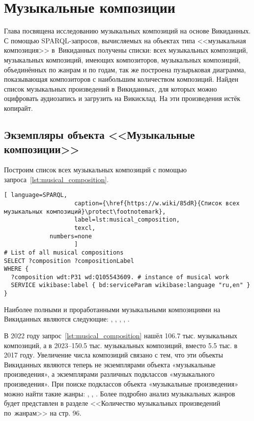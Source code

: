 \chapter{Музыкальные композиции}
\label{ch:musical-composition}
Глава посвящена исследованию музыкальных композиций на основе Викиданных. С помощью SPARQL-запросов, вычисляемых на объектах типа <<музыкальная композиция>> в~Викиданных получены списки: всех музыкальных композиций, музыкальных композиций, имеющих композиторов, музыкальных композиций, объединённых по жанрам и по годам, так же построена пузырьковая диаграмма, показывающая композиторов с наибольшим количеством композиций. Найден список музыкальных произведений в Викиданных, для которых можно оцифровать аудиозапись и загрузить на Викисклад. На эти произведения истёк копирайт.

\section{Экземпляры объекта <<Музыкальные композиции>>}


Построим список всех музыкальных композиций с помощью запроса~\ref{lst:musical_composition}.

\begin{lstlisting}[ language=SPARQL,
                    caption={\href{https://w.wiki/85dR}{Список всех  музыкальных композиций}\protect\footnotemark},
                    label=lst:musical_composition,
                    texcl,
	         numbers=none
                    ]
# List of all musical compositions
SELECT ?composition ?compositionLabel 
WHERE {
  ?composition wdt:P31 wd:Q105543609. # instance of musical work
  SERVICE wikibase:label { bd:serviceParam wikibase:language "ru,en" }
}
\end{lstlisting}%

Наиболее полными и проработанными музыкальными композициями на Викиданных являются следующие: , , , , .

В 2022 году запрос~\ref{lst:musical_composition} нашёл \num{106,7} тыс. музыкальных композиций, а в 2023--\num{150,5} тыс. музыкальных композиций, вместо \num{5,5} тыс. в 2017 году. Увеличение числа композиций связано с тем, что эти объекты Викиданных являются теперь не экземплярами объекта «музыкальные произведения», а экземплярами различных подклассов «музыкального произведения». При поиске подклассов объекта «музыкальные произведения» можно найти такие жанры: , , . Более подробно анализ музыкальных жанров будет представлен в разделе <<Количество музыкальных произведений по~жанрам>> на стр. 96.

